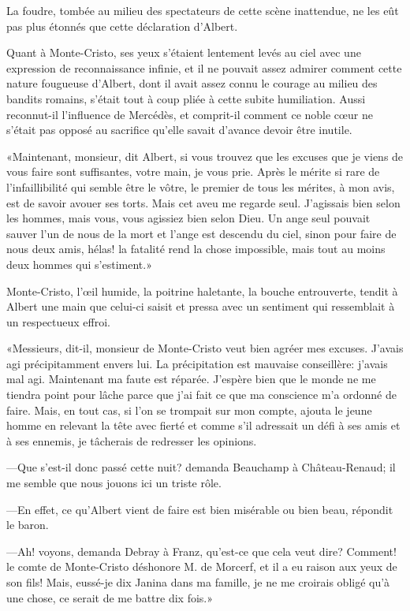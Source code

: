 La foudre, tombée au milieu des spectateurs de cette scène inattendue, ne les eût pas plus étonnés que cette déclaration d'Albert. 

Quant à Monte-Cristo, ses yeux s'étaient lentement levés au ciel avec une expression de reconnaissance infinie, et il ne pouvait assez admirer comment cette nature fougueuse d'Albert, dont il avait assez connu le courage au milieu des bandits romains, s'était tout à coup pliée à cette subite humiliation. Aussi reconnut-il l'influence de Mercédès, et comprit-il comment ce noble cœur ne s'était pas opposé au sacrifice qu'elle savait d'avance devoir être inutile. 

«Maintenant, monsieur, dit Albert, si vous trouvez que les excuses que je viens de vous faire sont suffisantes, votre main, je vous prie. Après le mérite si rare de l'infaillibilité qui semble être le vôtre, le premier de tous les mérites, à mon avis, est de savoir avouer ses torts. Mais cet aveu me regarde seul. J'agissais bien selon les hommes, mais vous, vous agissiez bien selon Dieu. Un ange seul pouvait sauver l'un de nous de la mort et l'ange est descendu du ciel, sinon pour faire de nous deux amis, hélas! la fatalité rend la chose impossible, mais tout au moins deux hommes qui s'estiment.» 

Monte-Cristo, l'œil humide, la poitrine haletante, la bouche entrouverte, tendit à Albert une main que celui-ci saisit et pressa avec un sentiment qui ressemblait à un respectueux effroi. 

«Messieurs, dit-il, monsieur de Monte-Cristo veut bien agréer mes excuses. J'avais agi précipitamment envers lui. La précipitation est mauvaise conseillère: j'avais mal agi. Maintenant ma faute est réparée. J'espère bien que le monde ne me tiendra point pour lâche parce que j'ai fait ce que ma conscience m'a ordonné de faire. Mais, en tout cas, si l'on se trompait sur mon compte, ajouta le jeune homme en relevant la tête avec fierté et comme s'il adressait un défi à ses amis et à ses ennemis, je tâcherais de redresser les opinions. 

—Que s'est-il donc passé cette nuit? demanda Beauchamp à Château-Renaud; il me semble que nous jouons ici un triste rôle. 

—En effet, ce qu'Albert vient de faire est bien misérable ou bien beau, répondit le baron. 

—Ah! voyons, demanda Debray à Franz, qu'est-ce que cela veut dire? Comment! le comte de Monte-Cristo déshonore M. de Morcerf, et il a eu raison aux yeux de son fils! Mais, eussé-je dix Janina dans ma famille, je ne me croirais obligé qu'à une chose, ce serait de me battre dix fois.» 

